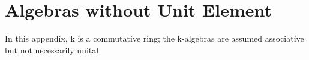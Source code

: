 \chapter{Algebras without Unit Element}

In this appendix, k is a commutative ring; the k-algebras are assumed associative but not necessarily unital.

